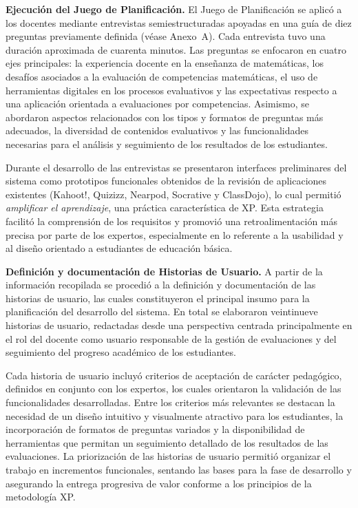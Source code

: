 \textbf{Ejecución del Juego de Planificación.} El Juego de Planificación se aplicó a los docentes mediante entrevistas semiestructuradas apoyadas en una guía de diez preguntas previamente definida (véase Anexo~A). Cada entrevista tuvo una duración aproximada de cuarenta minutos. Las preguntas se enfocaron en cuatro ejes principales: la experiencia docente en la enseñanza de matemáticas, los desafíos asociados a la evaluación de competencias matemáticas, el uso de herramientas digitales en los procesos evaluativos y las expectativas respecto a una aplicación orientada a evaluaciones por competencias. Asimismo, se abordaron aspectos relacionados con los tipos y formatos de preguntas más adecuados, la diversidad de contenidos evaluativos y las funcionalidades necesarias para el análisis y seguimiento de los resultados de los estudiantes.

Durante el desarrollo de las entrevistas se presentaron interfaces preliminares del sistema como prototipos funcionales obtenidos de la revisión de aplicaciones existentes (Kahoot!, Quizizz, Nearpod, Socrative y ClassDojo), lo cual permitió \textit{amplificar el aprendizaje}, una práctica característica de XP. Esta estrategia facilitó la comprensión de los requisitos y promovió una retroalimentación más precisa por parte de los expertos, especialmente en lo referente a la usabilidad y al diseño orientado a estudiantes de educación básica.

\textbf{Definición y documentación de Historias de Usuario.} A partir de la información recopilada se procedió a la definición y documentación de las historias de usuario, las cuales constituyeron el principal insumo para la planificación del desarrollo del sistema. En total se elaboraron veintinueve historias de usuario, redactadas desde una perspectiva centrada principalmente en el rol del docente como usuario responsable de la gestión de evaluaciones y del seguimiento del progreso académico de los estudiantes.

Cada historia de usuario incluyó criterios de aceptación de carácter pedagógico, definidos en conjunto con los expertos, los cuales orientaron la validación de las funcionalidades desarrolladas. Entre los criterios más relevantes se destacan la necesidad de un diseño intuitivo y visualmente atractivo para los estudiantes, la incorporación de formatos de preguntas variados y la disponibilidad de herramientas que permitan un seguimiento detallado de los resultados de las evaluaciones. La priorización de las historias de usuario permitió organizar el trabajo en incrementos funcionales, sentando las bases para la fase de desarrollo y asegurando la entrega progresiva de valor conforme a los principios de la metodología XP.

